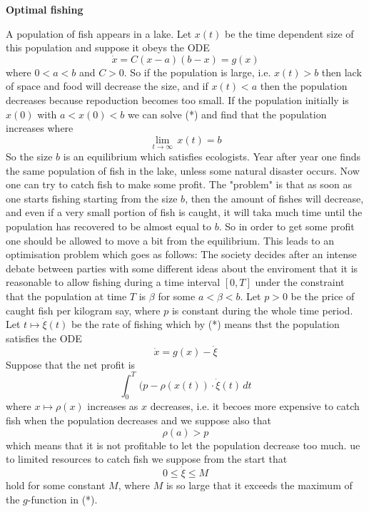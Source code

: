 \documentclass{amsart}
\begin{document}
\newtheorem{theorem}{Theorem} 
\newtheorem{lemma}{Lemma} 
\newtheorem{definition}{Definition} 
\newtheorem{notation}{Notation} 
\newtheorem{proposition}{Proposition}




\centerline{\bf{Optimal fishing}}
\medskip


\noindent
A population of fish appears  in a lake.
Let $x(t)$ be the time dependent 
size of this population and suppose it obeys  the ODE
\[
\dot x=C(x-a)(b-x)=g(x)\tag{*}
\]
where $0<a<b$ and $C>0$.
So  if the population is large, i.e. $x(t)>b$
then lack of space and food will
decrease the size, and if $x(t)<a$ then
the population  decreases because
repoduction becomes too small.
If the population initially is $x(0)$ with
$a<x(0)<b$ we can solve (*)
and find that
the population increases where
\[
\lim_{t\to \infty}\, x(t)=b
\]
So the size $b$ is an equilibrium which satisfies
ecologists.
Year after year one finds the same population of fish in the lake,
unless some natural disaster occurs.
Now one can try to catch fish to make some profit.
The "problem" is that as soon as one starts fishing
starting from the size  $b$, then the amount of fishes
will
decrease,  and even if a very small portion  of fish
is caught, it will
taka much time until
the population has recovered to be
almost equal to $b$.
So in order to get some profit  one should be
allowed to move a bit from the equilibrium.
This  leads to an optimisation problem which goes as follows:
The society decides after an intense debate
between parties with some different ideas about the
enviroment
that it is reasonable to
allow fishing during a time  interval $[0,T]$ under the
constraint  that the population at time $T$ is $\beta$ for some
$a<\beta<b$.
Let $p>0$ be  the price of caught fish per kilogram say, where
$p$ is 
constant  during the whole time period. Let 
$t\mapsto \dot \xi(t)$ be the rate of fishing
which by  (*) means thst the population
satisfies the ODE
\[
\dot x=g(x)-\ddot \xi
\]
Suppose that the net profit
is 
\[
\int_0^T\, (p-\rho(x(t))\cdot \dot \xi(t)\, dt
\]
where
$x\mapsto \rho(x)$
increases as $x$ decreases, i.e. it becoes more expensive to catch
fish
when the population  decreases and  we suppose also that
\[
\rho(a)>p
\] 
which means that it is not profitable to let
the population decrease too much.
ue to limited resources to
catch fish we suppose from the start that
\[
0\leq \dot \xi\leq M
\]
hold for some constant  $M$, where  $M$ is so large that
it exceeds the maximum of the $g$-function in (*).
\medskip
\end{document}
